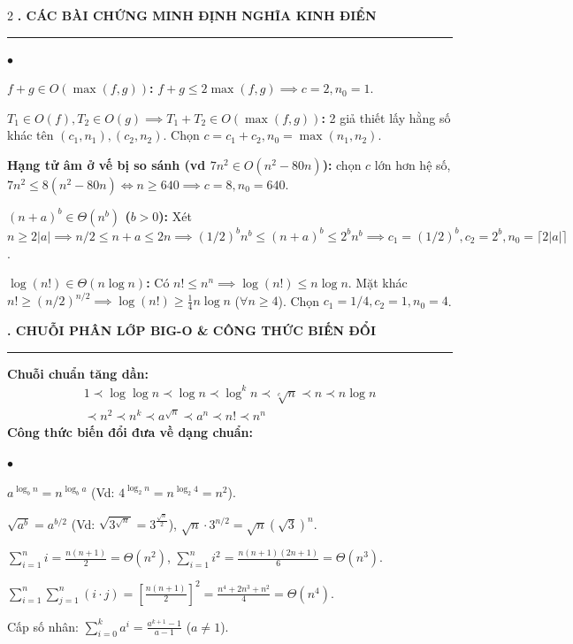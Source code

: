 \documentclass[9pt,a4paper]{article}
\def\labelitemi{$\bullet$}
\renewenvironment{itemize}{%
  \begin{list}{\labelitemi}{%
    \setlength{\topsep}{0pt}%
    \setlength{\partopsep}{0pt}%
    \setlength{\itemsep}{0pt}%
    \setlength{\parsep}{0pt}%
    \setlength{\leftmargin}{10pt}%
  }%
}{\end{list}}
\newcommand{\mysec}[1]{\vspace{2pt}\textbf{\fontsize{9.5}{10.5}\selectfont #1}\vspace{1pt}\hrule\vspace{2pt}}
\begin{document}
\begin{multicols*}{2}
\mysec{3. CÁC BÀI CHỨNG MINH ĐỊNH NGHĨA KINH ĐIỂN}
\begin{itemize}
  \item \textbf{$f+g \in O(\max(f, g))$:} $f+g \le 2\max(f, g) \implies c=2, n_0=1$.
  \item \textbf{$T_1 \in O(f), T_2 \in O(g) \implies T_1+T_2 \in O(\max(f, g))$:} 2 giả thiết lấy hằng số khác tên $(c_1, n_1), (c_2, n_2)$. Chọn $c = c_1 + c_2, n_0 = \max(n_1, n_2)$.
  \item \textbf{Hạng tử âm ở vế bị so sánh (vd $7n^2 \in O(n^2 - 80n)$):} chọn $c$ lớn hơn hệ số, $7n^2 \le 8(n^2 - 80n) \iff n \ge 640 \implies c = 8, n_0 = 640$.
  \item \textbf{$(n+a)^b \in \Theta(n^b)$ ($b>0$):} Xét $n \ge 2|a| \implies n/2 \le n+a \le 2n \implies (1/2)^b n^b \le (n+a)^b \le 2^b n^b \implies c_1=(1/2)^b, c_2=2^b, n_0=\lceil 2|a| \rceil$.
  \item \textbf{$\log(n!) \in \Theta(n \log n)$:} Có $n! \le n^n \implies \log(n!) \le n\log n$. Mặt khác $n! \ge (n/2)^{n/2} \implies \log(n!) \ge \frac{1}{4}n\log n$ ($\forall n \ge 4$). Chọn $c_1=1/4, c_2=1, n_0=4$.
\end{itemize}

\mysec{4. CHUỖI PHÂN LỚP BIG-O \& CÔNG THỨC BIẾN ĐỔI}
\textbf{Chuỗi chuẩn tăng dần:}
\begin{gather*}
1 \prec \log \log n \prec \log n \prec \log^k n \prec \sqrt[c]{n} \prec n \prec n \log n \\
\prec n^2 \prec n^k \prec a^{\sqrt{n}} \prec a^n \prec n! \prec n^n
\end{gather*}
\textbf{Công thức biến đổi đưa về dạng chuẩn:}
\begin{itemize}
  \item $a^{\log_b n} = n^{\log_b a}$ (Vd: $4^{\log_2 n} = n^{\log_2 4} = n^2$).
  \item $\sqrt{a^b} = a^{b/2}$ (Vd: $\sqrt{3^{\sqrt{n}}} = 3^{\frac{\sqrt{n}}{2}}$), $\sqrt{n} \cdot 3^{n/2} = \sqrt{n}(\sqrt{3})^n$.
  \item $\sum_{i=1}^n i = \frac{n(n+1)}{2} = \Theta(n^2)$, $\sum_{i=1}^n i^2 = \frac{n(n+1)(2n+1)}{6} = \Theta(n^3)$.
  \item $\sum_{i=1}^n \sum_{j=1}^n (i \cdot j) = [\frac{n(n+1)}{2}]^2 = \frac{n^4+2n^3+n^2}{4} = \Theta(n^4)$.
  \item Cấp số nhân: $\sum_{i=0}^{k} a^i = \frac{a^{k+1}-1}{a-1}$ ($a \ne 1$).
\end{itemize}


\end{multicols*}
\end{document}
